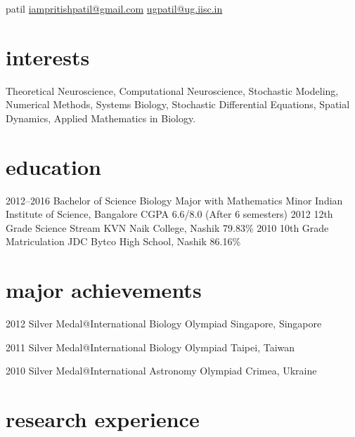 \documentclass[11pt]{friggeri-cv}%
\begin{document}
 {patil} 
        {\href{mailto:iampritishpatil@gmail.com}{iampritishpatil@gmail.com}\quad  
    \href{mailto:ugpatil@ug.iisc.in}{ugpatil@ug.iisc.in}
}



\section{interests}

Theoretical Neuroscience, Computational Neuroscience, Stochastic Modeling, Numerical Methods, Systems Biology, Stochastic Differential Equations, Spatial Dynamics, Applied Mathematics in Biology.


\section{education}

\begin{entrylist}
  \entryy
    {2012--2016}
    {Bachelor of Science {\normalfont Biology Major with Mathematics Minor }}
    {Indian Institute of Science, Bangalore}
    { CGPA 6.6/8.0  (After 6 semesters)}
  \entryy
    {2012}
    {12th Grade {\normalfont Science Stream}}
  {KVN Naik College, Nashik}
  { 79.83\%}
  \entryy
    {2010}
    {10th Grade     {\normalfont Matriculation}}
    {JDC Bytco High School, Nashik}
    {86.16\%}

\end{entrylist}


\section{major achievements}
\begin{entrylist}
  \entryyy
    {2012}
    { {\normalfont Silver Medal@}International Biology Olympiad     }
    {Singapore, Singapore}

  \entryyy
    {2011}
    {  {\normalfont Silver Medal@}International Biology Olympiad}
    {Taipei, Taiwan}
    
  \entryyy
    {2010}
    { {\normalfont Silver Medal@}International Astronomy Olympiad }
    {Crimea, Ukraine}



\end{entrylist}

\section{research experience}
\end{document}
